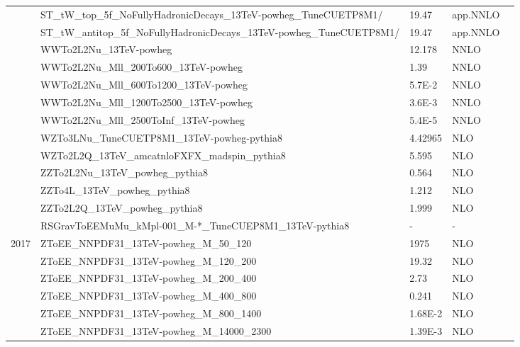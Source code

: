 \begin{table}[htp]
\begin{center}
{\begin{tabular}{|c|l|l|l|l|}
&ST\_tW\_top\_5f\_NoFullyHadronicDecays\_13TeV-powheg\_TuneCUETP8M1/         & 19.47         & app.NNLO           \\
&ST\_tW\_antitop\_5f\_NoFullyHadronicDecays\_13TeV-powheg\_TuneCUETP8M1/     & 19.47         & app.NNLO           \\\cline{2-4}
&WWTo2L2Nu\_13TeV-powheg                                        & 12.178       & NNLO                    \\
&WWTo2L2Nu\_Mll\_200To600\_13TeV-powheg                         & 1.39     & NNLO                 \\
&WWTo2L2Nu\_Mll\_600To1200\_13TeV-powheg                        & 5.7E-2    & NNLO                    \\
&WWTo2L2Nu\_Mll\_1200To2500\_13TeV-powheg                       & 3.6E-3    & NNLO                    \\
&WWTo2L2Nu\_Mll\_2500ToInf\_13TeV-powheg                        & 5.4E-5      & NNLO                  \\
&WZTo3LNu\_TuneCUETP8M1\_13TeV-powheg-pythia8 &    4.42965 & NLO                \\
&WZTo2L2Q\_13TeV\_amcatnloFXFX\_madspin\_pythia8 &    5.595& NLO                \\
&ZZTo2L2Nu\_13TeV\_powheg\_pythia8 &   0.564& NLO                \\
&ZZTo4L\_13TeV\_powheg\_pythia8 &     1.212 & NLO                \\
&ZZTo2L2Q\_13TeV\_powheg\_pythia8 &    1.999& NLO                \\\cline{2-4}
&RSGravToEEMuMu\_kMpl-001\_M-*\_TuneCUEP8M1\_13TeV-pythia8               & -            & -                               \\\hline
\multirow{17}{*}{2017}&ZToEE\_NNPDF31\_13TeV-powheg\_M\_50\_120                & 1975         & NLO                \\
&ZToEE\_NNPDF31\_13TeV-powheg\_M\_120\_200                & 19.32        & NLO                  \\
&ZToEE\_NNPDF31\_13TeV-powheg\_M\_200\_400                & 2.73         & NLO                 \\
&ZToEE\_NNPDF31\_13TeV-powheg\_M\_400\_800                & 0.241        & NLO                 \\
&ZToEE\_NNPDF31\_13TeV-powheg\_M\_800\_1400               & 1.68E-2      & NLO                 \\
&ZToEE\_NNPDF31\_13TeV-powheg\_M\_14000\_2300             & 1.39E-3      & NLO                \\

\end{tabular}}
\end{center}
\end{table}
